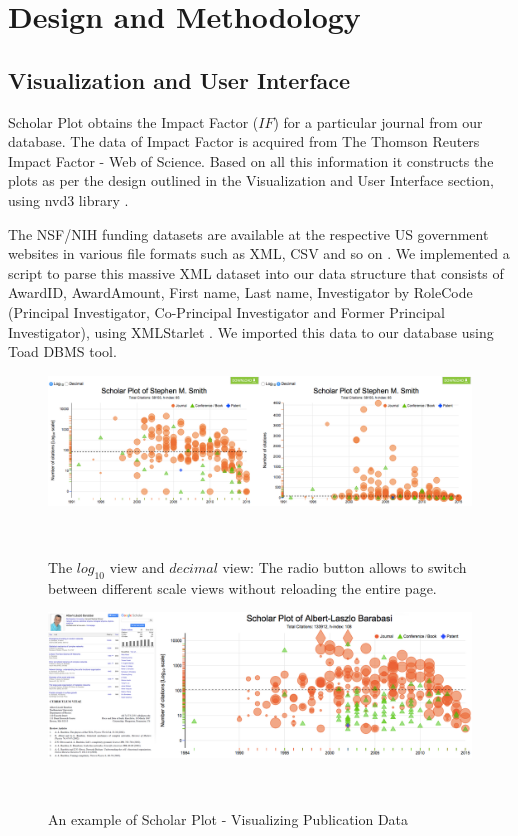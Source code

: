 \chapter{Design and Methodology}\label{chap:Methods }


\section{Visualization and User Interface}
Scholar Plot obtains the Impact Factor ($IF$) for a particular journal from our database. The data of Impact Factor is acquired from The Thomson Reuters Impact Factor - Web of Science. Based on all this information it constructs the plots as per the design outlined in the Visualization and User Interface section, using nvd3 library \cite{nvd3org}.


The NSF/NIH funding datasets are available at the respective US government websites in various file formats such as XML, CSV and so on \cite{nsf, nih}. We implemented a script to parse this massive XML dataset into our data structure that consists of AwardID, AwardAmount, First name, Last name, Investigator by RoleCode (Principal Investigator, Co-Principal Investigator and Former Principal Investigator), using XMLStarlet \cite{XMLStarlet}. We imported this data to our database using Toad DBMS tool. %

\begin{figure}%
\centering
  \includegraphics[width=1\columnwidth]{figures/fig_scaleView}
  \caption{The $log_{10}$ view and $decimal$ view: The radio button allows to switch between different scale views without reloading the entire page.}~\label{fig:fig-scale}
\end{figure}

\begin{figure}
  \centering
  \includegraphics[width=2\columnwidth]{figures/fig_cv_google_scholarplot}
  \caption{An example of Scholar Plot - Visualizing Publication Data}~\label{fig:fig-publication}
\end{figure}

